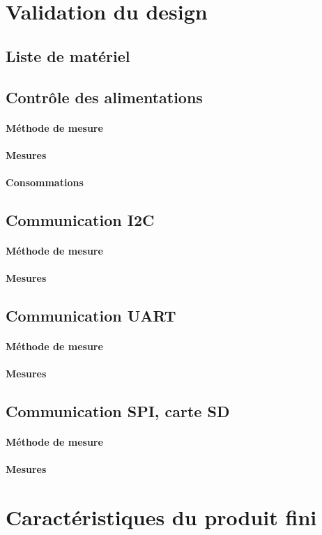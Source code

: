 \clearpage

\section{Validation du design} \label{sec:Validation-design}

\subsection{Liste de matériel} \label{ssec:Liste-materiel}

\subsection{Contrôle des alimentations} \label{ssec:Controle-alims}
\paragraph{Méthode de mesure}
\paragraph{Mesures}

\paragraph{Consommations}

\subsection{Communication I2C} \label{ssec:Comm-I2C}
\paragraph{Méthode de mesure}
\paragraph{Mesures}

\subsection{Communication UART} \label{ssec:Comm-UART}
\paragraph{Méthode de mesure}
\paragraph{Mesures}

\subsection{Communication SPI, carte SD} \label{ssec:Comm-SPI}
\paragraph{Méthode de mesure}
\paragraph{Mesures}

\section{Caractéristiques du produit fini} \label{sec:Carac-finis}
